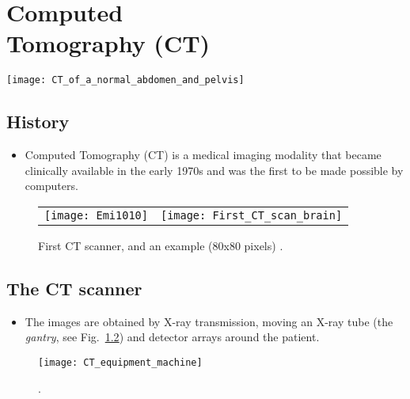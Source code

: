 \chapter{Computed\\Tomography (CT)}
\vspace{-43ex}
\begin{flushright}
\texttt{[image: CT\_of\_a\_normal\_abdomen\_and\_pelvis]} %
\end{flushright}

\section{History}
\begin{itemize}
\item Computed Tomography (CT) is a medical imaging modality that became
clinically available in the early 1970s and was the first to be made
possible by computers.
\end{itemize}
\vspace{-3ex}
\begin{figure}[h!]
  \centering
  \begin{tabular}{cc}
    \texttt{[image: Emi1010]} &
                                           \texttt{[image: First\_CT\_scan\_brain]}
  \end{tabular}
  \caption{First CT scanner, and an example (80x80 pixels)
    \cite{Wikipedia_CT_history,Wikipedia_CT_abdomen}.\label{fig:first_CT}}
\end{figure}

\section{The CT scanner}
\begin{itemize}
\item The images are obtained by X-ray transmission, moving an X-ray
  tube (the \emph{gantry}, see Fig.~\ref{fig:CT_equipment_machine})
  and detector arrays around the patient.
\end{itemize}
\vspace{-3ex}
\begin{figure}[h!]
  \centering
  \texttt{[image: CT\_equipment\_machine]}
  \caption{ \cite{morin2025radiation}.\label{fig:CT_equipment_machine}}
\end{figure}

